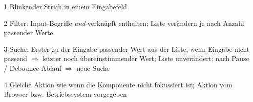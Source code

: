 \begin{table}[!htb]
\begin{adjustbox}{max width=\textwidth}
\begin{threeparttable}
\begin{tablenotes}
                \item[1] Blinkender Strich in einem Eingabefeld
                \item[2] Filter: Input-Begriffe \emph{and}-verknüpft enthalten; 
                                Liste verändern je nach Anzahl passender Werte
                \item[3] Suche: Erster zu der Eingabe passender Wert aus der Liste, wenn Eingabe nicht passend $\Rightarrow$ letzter noch übereinstimmender Wert; 
                                Liste unverändert; nach Pause / Debounce-Ablauf $\Rightarrow$ neue Suche
                \item[4] Gleiche Aktion wie wenn die Komponente nicht fokussiert ist; Aktion vom Browser bzw. Betriebssystem vorgegeben
            \end{tablenotes}
        \end{threeparttable}
    \end{adjustbox}
\end{table}
